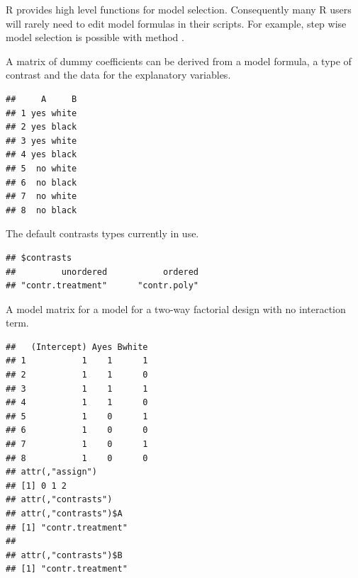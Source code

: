 \documentclass[krantz2]{krantz}\usepackage{knitr}%
\begin{document}
\begin{explainbox}
R provides high level functions for model selection. Consequently many R users will rarely need to edit model formulas in their scripts. For example, step wise model selection is possible with \Rlang method .

A matrix of dummy coefficients can be derived from a model formula, a type of contrast and the data for the explanatory variables.
\begin{knitrout}\footnotesize
{}\color{fgcolor}\begin{kframe}
\begin{alltt}
 \hlkwb{<-} \hlstd{(} \hlstd{=} \hlstd{(}\hlstd{(}\hlstd{,} \hlstd{),} \hlstd{(}\hlstd{,} \hlstd{)),}
                         \hlstd{=} \hlstd{(}\hlstd{(}\hlstd{,} \hlstd{),} \hlstd{))}
\end{alltt}
\begin{verbatim}
##     A     B
## 1 yes white
## 2 yes black
## 3 yes white
## 4 yes black
## 5  no white
## 6  no black
## 7  no white
## 8  no black
\end{verbatim}
\end{kframe}
\end{knitrout}

The default contrasts types currently in use.
\begin{knitrout}\footnotesize
{}\color{fgcolor}\begin{kframe}
\begin{alltt}
\hlstd{(}\hlstd{)}
\end{alltt}
\begin{verbatim}
## $contrasts
##         unordered           ordered 
## "contr.treatment"      "contr.poly"
\end{verbatim}
\end{kframe}
\end{knitrout}

A model matrix for a model for a two-way factorial design with no interaction term.
\begin{knitrout}\footnotesize
{}\color{fgcolor}\begin{kframe}
\begin{alltt}
\hlstd{(}\hlopt{~}  \hlopt{+} 
\end{alltt}
\begin{verbatim}
##   (Intercept) Ayes Bwhite
## 1           1    1      1
## 2           1    1      0
## 3           1    1      1
## 4           1    1      0
## 5           1    0      1
## 6           1    0      0
## 7           1    0      1
## 8           1    0      0
## attr(,"assign")
## [1] 0 1 2
## attr(,"contrasts")
## attr(,"contrasts")$A
## [1] "contr.treatment"
## 
## attr(,"contrasts")$B
## [1] "contr.treatment"
\end{verbatim}
\end{kframe}
\end{knitrout}


\end{explainbox}
\end{document}
